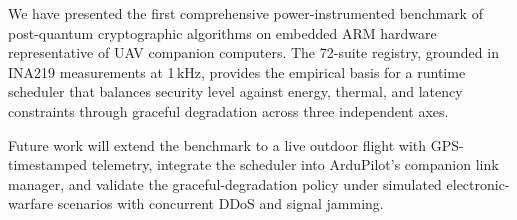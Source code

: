 \documentclass[conference]{IEEEtran}
\begin{document}
We have presented the first comprehensive power-instrumented
benchmark of post-quantum cryptographic algorithms on embedded
ARM hardware representative of UAV companion computers.  The
72-suite registry, grounded in INA219 measurements at 1\,kHz,
provides the empirical basis for a runtime scheduler that balances
security level against energy, thermal, and latency constraints
through graceful degradation across three independent axes.

Future work will extend the benchmark to a live outdoor flight
with GPS-timestamped telemetry, integrate the scheduler into
ArduPilot's companion link manager, and validate the graceful-degradation
policy under simulated electronic-warfare scenarios with
concurrent DDoS and signal jamming.


\balance


\end{document}
